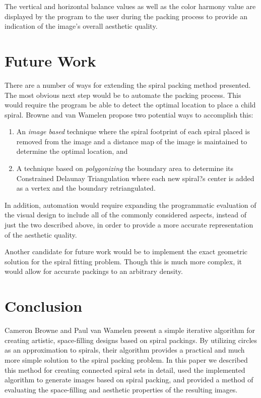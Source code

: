\documentclass[11pt]{IEEEtran}
\begin{document}
The vertical and horizontal balance values as well as the color harmony value are displayed by the program to the user during the packing process to provide an indication of the image's overall aesthetic quality.

\section{Future Work}
\label{future}
There are a number of ways for extending the spiral packing method presented. The most obvious next step would be to automate the packing process. This would require the program be able to detect the optimal location to place a child spiral. Browne and van Wamelen propose two potential ways to accomplish this\cite{Browne2006834}: 
\begin{enumerate}
	\item An \textit{image based} technique where the spiral footprint of each spiral placed is removed from the image and a distance map of the image is maintained to determine the optimal location, and 
	\item A technique based on \textit{polygonizing} the boundary area to determine its Constrained Delaunay Triangulation where each new spiral?s center is added as a vertex and the boundary retriangulated.
\end{enumerate}
In addition, automation would require expanding the programmatic evaluation of the visual design to include all of the commonly considered aspects, instead of just the two described above, in order to provide a more accurate representation of the aesthetic quality. 

Another candidate for future work would be to implement the exact geometric solution for the spiral fitting problem. Though this is much more complex, it would allow for accurate packings to an arbitrary density.

\section{Conclusion}
\label{conclusion}
Cameron Browne and Paul van Wamelen present a simple iterative algorithm for creating artistic, space-filling designs based on spiral packings. By utilizing circles as an approximation to spirals, their algorithm provides a practical and much more simple solution to the spiral packing problem. In this paper we described this method for creating connected spiral sets in detail, used the implemented algorithm to generate images based on spiral packing, and provided a method of evaluating the space-filling and aesthetic properties of the resulting images. 
\end{document}
